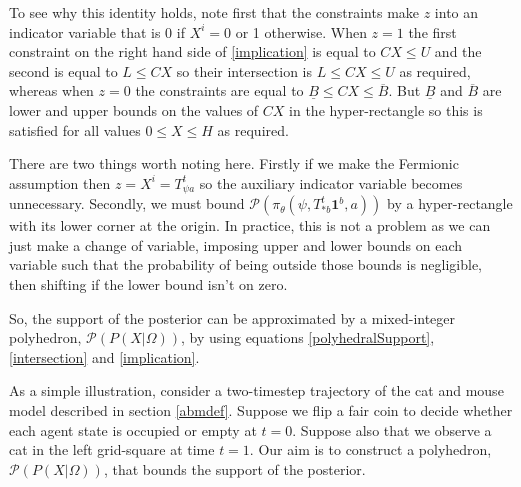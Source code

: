 \documentclass{article}
\begin{document}
To see why this identity holds, note first that the constraints make $z$ into an indicator variable that is 0 if $X^i=0$ or 1 otherwise. When $z=1$ the first constraint on the right hand side of \eqref{implication} is equal to $CX \le U$ and the second is equal to $L \le CX$ so their intersection is $L \le  CX \le U$ as required, whereas when $z=0$ the constraints are equal to $\underline{B} \le CX \le \overline{B}$. But $\underline{B}$ and $\overline{B}$ are lower and upper bounds on the values of $CX$ in the hyper-rectangle so this is satisfied for all values $0 \le X \le H$ as required. 

There are two things worth noting here. Firstly if we make the Fermionic assumption then $z = X^i = T^t_{\psi a}$ so the auxiliary indicator variable becomes unnecessary. Secondly, we must bound $\mathcal{P}(\pi_\theta(\psi,T^t_{*b}\mathbf{1}^b,a))$ by a hyper-rectangle with its lower corner at the origin. In practice, this is not a problem as we can just make a change of variable, imposing upper and lower bounds on each variable such that the probability of being outside those bounds is negligible, then shifting if the lower bound isn't on zero.

So, the support of the posterior can be approximated by a mixed-integer polyhedron, $\mathcal{P}(P(X|\Omega))$, by using equations \eqref{polyhedralSupport}, \eqref{intersection} and \eqref{implication}.

As a simple illustration, consider a two-timestep trajectory of the cat and mouse model described in section \ref{abmdef}. Suppose we flip a fair coin to decide whether each agent state is occupied or empty at $t=0$. Suppose also that we observe a cat in the left grid-square at time $t=1$. Our aim is to construct a polyhedron, $\mathcal{P}(P(X|\Omega))$, that bounds the support of the posterior.
\end{document}
